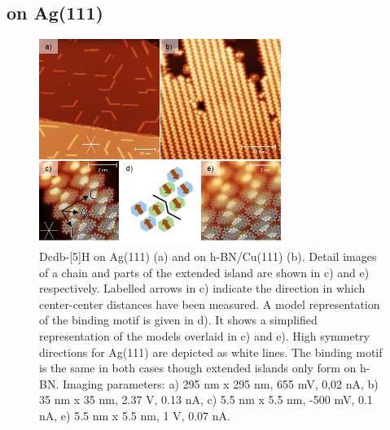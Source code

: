 \subsection{on Ag(111)}
\begin{figure} \centering
	\includegraphics[width=0.7\textwidth]{./images/paper/helicene/fig2}
	\caption{Dcdb-[5]H on Ag(111) (a) and on h-BN/Cu(111) (b). Detail images of a chain and parts of the extended island are shown in c) and e) respectively. Labelled arrows in c) indicate the direction in which center-center distances have been measured. A model representation of the binding motif is given in d). It shows a simplified representation of the models overlaid in c) and e). High symmetry directions for Ag(111) are depicted as white lines. The binding motif is the same in both cases though extended islands only form on h-BN. Imaging parameters: a) 295 nm x 295 nm, 655 mV, 0,02 nA, b) 35 nm x 35 nm, 2.37 V, 0.13 nA, c) 5.5 nm x 5.5 nm, -500 mV, 0.1 nA, e) 5.5 nm x 5.5 nm, 1 V, 0.07 nA.}
	\label{fig:hel-fig2}
\end{figure}


